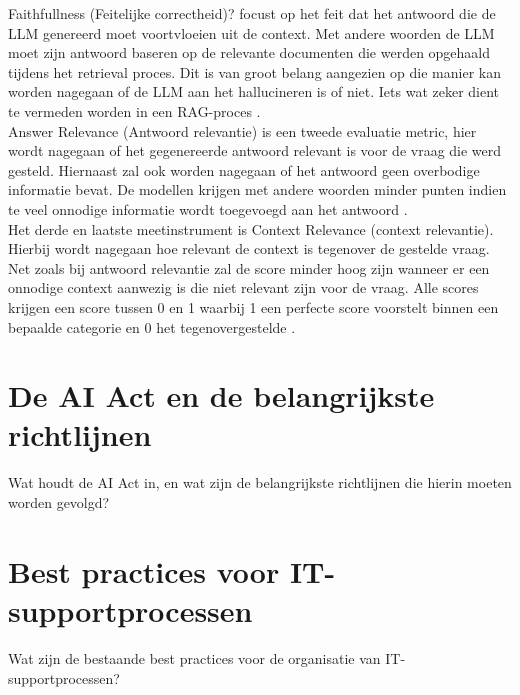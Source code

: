 Faithfullness (Feitelijke correctheid)? focust op het feit dat het antwoord die de LLM genereerd moet voortvloeien uit de context. Met andere woorden de LLM moet zijn antwoord baseren op de relevante documenten die werden opgehaald tijdens het retrieval proces. Dit is van groot belang aangezien op die manier kan worden nagegaan of de LLM aan het hallucineren is of niet. Iets wat zeker dient te vermeden worden in een RAG-proces \autocite{Es2023}.
\\[1em]
Answer Relevance (Antwoord relevantie) is een tweede evaluatie metric, hier wordt nagegaan of het gegenereerde antwoord relevant is voor de vraag die werd gesteld. Hiernaast zal ook worden nagegaan of het antwoord geen overbodige informatie bevat. De modellen krijgen met andere woorden minder punten indien te veel onnodige informatie wordt toegevoegd aan het antwoord \autocite{Es2023}.
\\[1em]
Het derde en laatste meetinstrument is Context Relevance (context relevantie). Hierbij wordt nagegaan hoe relevant de context is tegenover de gestelde vraag. Net zoals bij antwoord relevantie zal de score minder hoog zijn wanneer er een onnodige context aanwezig is die niet relevant zijn voor de vraag. Alle scores krijgen een score tussen 0 en 1 waarbij 1 een perfecte score voorstelt binnen een bepaalde categorie en 0 het tegenovergestelde \autocite{Es2023}.

\section{De AI Act en de belangrijkste richtlijnen}
Wat houdt de AI Act in, en wat zijn de belangrijkste richtlijnen die hierin moeten worden gevolgd?

\section{Best practices voor IT-supportprocessen}
Wat zijn de bestaande best practices voor de organisatie van IT-supportprocessen?
